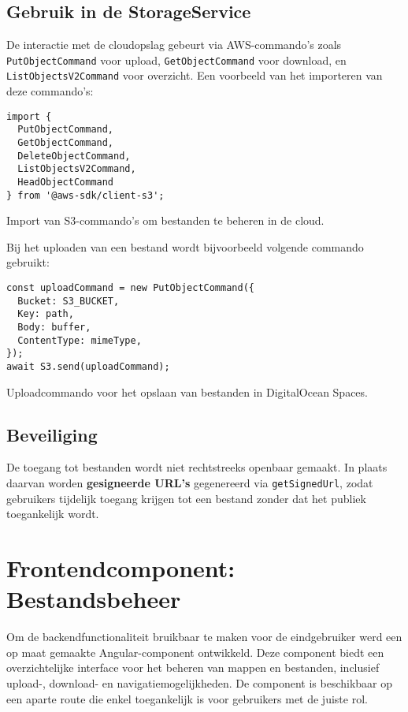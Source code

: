 \subsection{Gebruik in de StorageService}

De interactie met de cloudopslag gebeurt via AWS-commando’s zoals \texttt{PutObjectCommand} voor upload, \texttt{GetObjectCommand} voor download, en \texttt{ListObjectsV2Command} voor overzicht. Een voorbeeld van het importeren van deze commando’s:

\begin{listing}[H]
\begin{verbatim}
import {
  PutObjectCommand,
  GetObjectCommand,
  DeleteObjectCommand,
  ListObjectsV2Command,
  HeadObjectCommand
} from '@aws-sdk/client-s3';
\end{verbatim}
\caption[Import van S3-commando's]{Import van S3-commando's om bestanden te beheren in de cloud.}
\end{listing}

Bij het uploaden van een bestand wordt bijvoorbeeld volgende commando gebruikt:

\begin{listing}[H]
\begin{verbatim}
const uploadCommand = new PutObjectCommand({
  Bucket: S3_BUCKET,
  Key: path,
  Body: buffer,
  ContentType: mimeType,
});
await S3.send(uploadCommand);
\end{verbatim}
\caption[Uploaden van bestanden naar S3]{Uploadcommando voor het opslaan van bestanden in DigitalOcean Spaces.}
\end{listing}

\subsection{Beveiliging}

De toegang tot bestanden wordt niet rechtstreeks openbaar gemaakt. In plaats daarvan worden \textbf{gesigneerde URL’s} gegenereerd via \texttt{getSignedUrl}, zodat gebruikers tijdelijk toegang krijgen tot een bestand zonder dat het publiek toegankelijk wordt.

\section{Frontendcomponent: Bestandsbeheer}
\label{sec:frontend-component}

Om de backendfunctionaliteit bruikbaar te maken voor de eindgebruiker werd een op maat gemaakte Angular-component ontwikkeld. Deze component biedt een overzichtelijke interface voor het beheren van mappen en bestanden, inclusief upload-, download- en navigatiemogelijkheden. De component is beschikbaar op een aparte route die enkel toegankelijk is voor gebruikers met de juiste rol.

